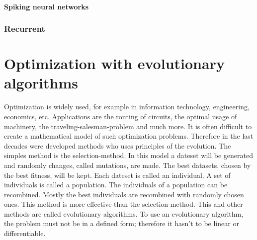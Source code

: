 \documentclass[10pt,a4paper,DIV=11]{scrreprt}
\begin{document}
\subsubsection{Spiking neural networks}


\subsection{Recurrent}




\chapter{Optimization with evolutionary algorithms}
Optimization is widely used, for example in information technology, engineering,
economics, etc. Applications are the routing of circuits, the optimal usage of machinery,
the traveling-salesman-problem and much more. It is often difficult to create a mathematical
model of such optimization problems. Therefore in the last decades were developed methods who
uses principles of the evolution.
The simples method is the selection-method. In this model a dateset will be generated and randomly
changes, called mutations, are made. The best datasets, chosen by the best fitness, will be kept.
Each dateset is called an individual. A set of individuals is called a population. The individuals
of a population can be recombined. Mostly the best individuals are recombined with randomly chosen
ones. This method is more effective than the selection-method. This and other methods are  called
evolutionary algorithms. To use an evolutionary algorithm, the problem must not be in a defined form;
therefore it hasn't to be linear or differentiable. \\
\end{document}
